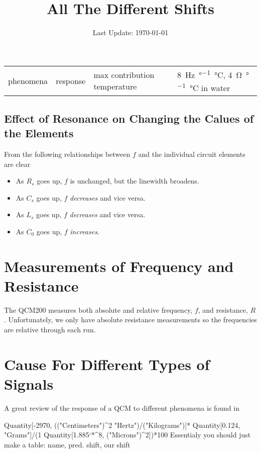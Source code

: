 \documentclass[a4paper]{article}
\begin{document}
\title{All The Different Shifts}
\date{Last Update: \today}
\maketitle
\tableofcontents

\begin{table}
 \begin{tabularx}{\textwidth}{ll}
  \toprule
  phenomena & response & max contribution
  \midrule
  temperature & 
   \SI{8}{\hertz\per\degree\celsius}, \SI{4}{\ohm\per\degree\celsius} in water\cite{srsqcm}
  \bottomrule
 \end{tabularx}
\end{table}

\subsection{Effect of Resonance on Changing the Calues of the Elements}
From  the following relationships between $f$ and
the individual circuit elements are clear
\begin{itemize}
 \item As $R_s$ goes up, $f$ is unchanged, but the linewidth broadens.
 \item As $C_s$ goes up, $f$ \textit{decreases} and vice versa.
 \item As $L_s$ goes up, $f$ \textit{decreases} and vice versa. 
 \item As $C_0$ goes up, $f$ \textit{increases}.
\end{itemize}

\section{Measurements of Frequency and Resistance}
The QCM200 measures both absolute and relative frequency, $f$, and
resistance, $R$.  Unfortunately, we only have absolute resistance
measurements so the frequencies are relative through each run.

\section{Cause For Different Types of Signals}
A great review of the response of a QCM to different phenomena is found in \cite{walls1995fundamental}

Quantity[-2970, (("Centimeters")^2 "Hertz")/("Kilograms")]*
 Quantity[0.124, "Grams"]/(1 Quantity[1.885`*^8, ("Microns")^2])*100
Essentialy you should just make a table: name, pred. shift, our shift
\end{document}
